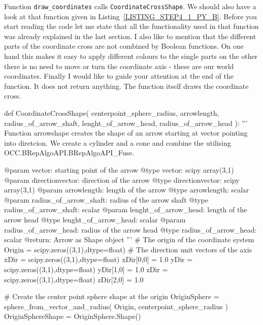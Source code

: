 Function {\tt draw\_coordinates} calls {\tt CoordinateCrossShape}.
We should also have a look at that function given in Listing~\ref{LISTING_STEP4_1_PY_B}.
Before you start reading the code let me state that all the functionality used in that function was already explained in the last section.
I also like to mention that the different parts of the coordinate cross are not combined by Boolean functions.
On one hand this makes it easy to apply different colours to the single parts on the other there is no need to move or turn the coordinate axis - these are our world coordinates.
Finally I would like to guide your attention at the end of the function.
It does not return anything.
The function itself draws the coordinate cross.
%
\begin{python}[moreemph={[4], 46, 48},caption={Step4\_1.py - Drawing a coordinate system -- function {\tt CoordinateCrossShape} which is called by function {\tt draw\_coordinates}},label=LISTING_STEP4_1_PY_B]
def CoordinateCrossShape(   centerpoint_sphere_radius,
                            arrowlength,
                            radius_of_arrow_shaft,
                            lenght_of_arrow_head,
                            radius_of_arrow_head ):
    '''
    Function arrowshape creates the shape of an arrow starting at vector
    pointing into diretcion. We create a cylinder and a cone and combine the 
    utilising OCC.BRepAlgoAPI.BRepAlgoAPI_Fuse.

    @param vector: starting point of the arrow
    @type  vector: scipy array(3,1)
    @param directionvector: direction of the arrow
    @type  directionvector: scipy  array(3,1)
    @param arrowlength: length of the arrow
    @type  arrowlength: scalar
    @param radius_of_arrow_shaft: radius of the arrow shaft
    @type  radius_of_arrow_shaft: scalar
    @param lenght_of_arrow_head: length of the arrow head
    @type  lenght_of_arrow_head: scalar
    @param radius_of_arrow_head: radius of the arrow head
    @type  radius_of_arrow_head: scalar
    @return: Arrow as Shape object
    '''
    # The origin of the coordinate system
    Origin = scipy.zeros((3,1),dtype=float)
    # The direction unit vectors of the axis
    xDir = scipy.zeros((3,1),dtype=float)
    xDir[0,0] = 1.0
    yDir = scipy.zeros((3,1),dtype=float)
    yDir[1,0] = 1.0
    zDir = scipy.zeros((3,1),dtype=float)
    zDir[2,0] = 1.0
    
    # Create the center point sphere shape at the origin
    OriginSphere = sphere_from_vector_and_radius(   Origin, 
                                                    centerpoint_sphere_radius )
    OriginSphereShape = OriginSphere.Shape()


\end{python}
